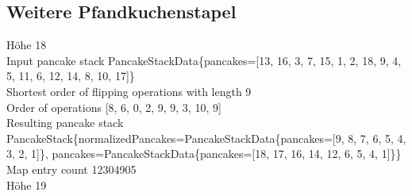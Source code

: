 \subsection{Weitere Pfandkuchenstapel}\label{subsec:weitere-pfandkuchenstapel}
Höhe 18 \\
Input pancake stack PancakeStackData\{pancakes=[13, 16, 3, 7, 15, 1, 2, 18, 9, 4, 5, 11, 6, 12, 14, 8, 10, 17]\} \\
Shortest order of flipping operations with length 9 \\
Order of operations [8, 6, 0, 2, 9, 9, 3, 10, 9] \\
Resulting pancake stack PancakeStack\{normalizedPancakes=PancakeStackData\{pancakes=[9, 8, 7, 6, 5, 4, 3, 2, 1]\}, pancakes=PancakeStackData\{pancakes=[18, 17, 16, 14, 12, 6, 5, 4, 1]\}\} \\
Map entry count 12304905 \\
Höhe 19 \\

